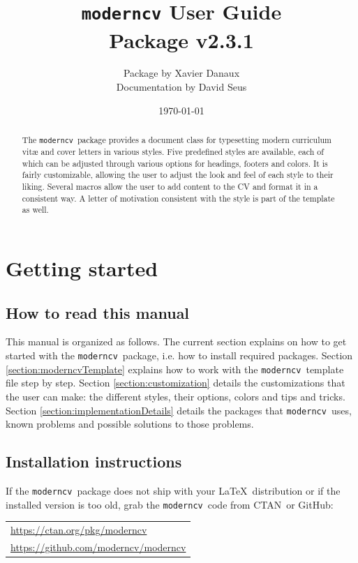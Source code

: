 \documentclass[a4paper, 11pt]{article}
\title{%
  \texttt{moderncv} User Guide\\
  {\small Package v2.3.1}%
}
\author{%
  Package by Xavier Danaux\\
  {\small Documentation by David Seus}%
}
\date{\today}
\newcommand{\code}[1]{\lstinline!#1!}
\newcommand{\moderncv}{\code{moderncv}}
\newcommand{\Moderncv}{\moderncv~}
\newcommand{\github}{GitHub}
\newcommand{\ctan}{CTAN}
\newcommand{\Ctan}{\ctan~}
\newcommand{\Latex}{\LaTeX~}
\newcommand{\moderncvGithub}{\url{https://github.com/moderncv/moderncv}}
\newcommand{\moderncvCtan}{\url{https://ctan.org/pkg/moderncv}}
\begin{document}
\maketitle
\begin{abstract}
  \noindent
  The \Moderncv package provides a document class for typesetting modern curriculum vit\ae{} and cover letters in various styles.
  Five predefined styles are available, each of which can be adjusted through various options for headings, footers and colors.
  It is fairly customizable, allowing the user to adjust the look and feel of each style to their liking.
  Several macros allow the user to add content to the CV and format it in a consistent way.
  A letter of motivation consistent with the style is part of the template as well.
\end{abstract}
\tableofcontents



\section{Getting started}
\subsection{How to read this manual}
This manual is organized as follows.
The current section explains on how to get started with the \Moderncv package, i.e. how to install required packages.
Section \ref{section:moderncvTemplate} explains how to work with the \Moderncv template file step by step.
Section \ref{section:customization} details the customizations that the user can make: the different styles, their options, colors and tips and tricks.
Section \ref{section:implementationDetails} details the packages that \Moderncv uses, known problems and possible solutions to those problems.

\subsection{Installation instructions}
If the \Moderncv package does not ship with your \Latex distribution or if the installed version is too old, grab the \Moderncv code from \Ctan or \github:

\begin{tabular}{l}
  \moderncvCtan \\%
  \moderncvGithub
\end{tabular}
\end{document}
